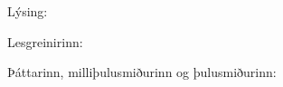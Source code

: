 \documentclass{skil}
\begin{document}
Lýsing:

\newpage

Lesgreinirinn:

\newpage

Þáttarinn, milliþulusmiðurinn og þulusmiðurinn:

\newpage

	
\end{document}
